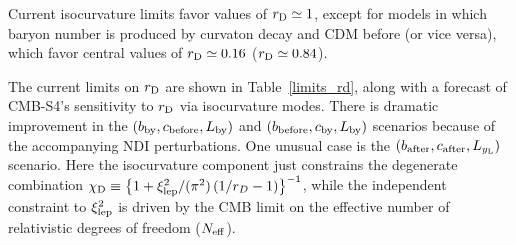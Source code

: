 Current isocurvature limits favor values of $r_{\rm D}\simeq 1$, except for models in which baryon number is produced by curvaton decay and CDM before (or vice versa), which favor central values of $r_{\rm D} \simeq 0.16$ ($r_{\rm D} \simeq 0.84$). 

The current limits \cite{Smith:2015bln} on $r_{\rm D}$ are shown in Table~\ref{limits_rd}, along with a forecast of CMB-S4's sensitivity to $r_{\rm D}$ via isocurvature modes. There is dramatic improvement in the $(b_{\rm by},c_{\rm before},L_{\rm by})$ and $(b_{\rm before},c_{\rm by},L_{\rm by})$ scenarios because of the accompanying NDI perturbations. One unusual case is the $(b_{\rm after},c_{\rm after}, L_{y_{\rm L}})$ scenario. Here the isocurvature component just constrains the degenerate combination \cite{Smith:2015bln} $\chi_{\rm D} \equiv \left\{1+\xi_{\rm lep}^2/(\pi^2) \left(1/r_D -1\right)\right\}^{-1}$, while the independent constraint to $\xi_{\rm lep}^{2}$ is driven by the CMB limit on the effective number of relativistic degrees of freedom ($N_{\rm eff}$).

